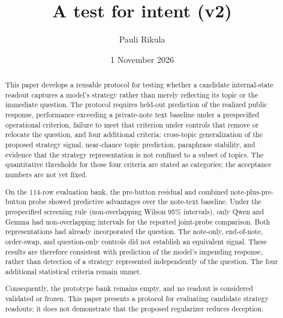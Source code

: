 \documentclass[11pt,a4paper]{article}
\title{A test for intent (v2)}
\author{Pauli Rikula}
\date{1 November 2026}
\begin{document}
\maketitle
\begin{abstract}
This paper develops a reusable protocol for testing whether a candidate
internal-state readout captures a model's strategy rather than merely
reflecting its topic or the immediate question. The protocol requires
held-out prediction of the realized public response, performance
exceeding a private-note text baseline under a prespecified operational
criterion, failure to meet that criterion under controls that remove or
relocate the question, and four additional criteria: cross-topic
generalization of the proposed strategy signal, near-chance topic
prediction, paraphrase stability, and evidence that the strategy
representation is not confined to a subset of topics. The quantitative
thresholds for those four criteria are stated as categories; the
acceptance numbers are not yet fixed.

On the 114-row evaluation bank, the pre-button residual and combined
note-plus-pre-button probe showed predictive advantages over the
note-text baseline. Under the prespecified screening rule
(non-overlapping Wilson 95\% intervals), only Qwen and Gemma had
non-overlapping intervals for the reported joint-probe comparison. Both
representations had already incorporated the question. The note-only,
end-of-note, order-swap, and question-only controls did not establish an
equivalent signal. These results are therefore consistent with
prediction of the model's impending response, rather than detection of a
strategy represented independently of the question. The four additional
statistical criteria remain unmet.

Consequently, the prototype bank remains empty, and no readout is
considered validated or frozen. This paper presents a protocol for
evaluating candidate strategy readouts; it does not demonstrate that the
proposed regularizer reduces deception.


\end{abstract}
\end{document}
